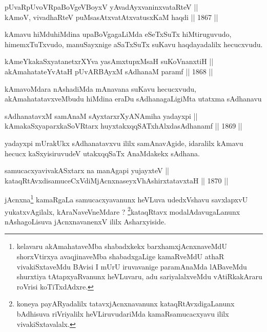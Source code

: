 \begin{shl}
pUvaRpUvoVRpaBoVgeVBoyxV yAvadAyxvaninxvataRteV || \\
kAmoV, vivadhaRteV puMsasAtxvatAtxvatusxKaM haqdi \hfill || 1867 ||
  
\end{shl}

\begin{artha}
kAmavu hiMduhiMdina upaBoVgagaLiMda eSeTxSuTx hiMtiruguvudo,
himemxTuTxvudo, manuSayxnige aSaTxSuTx suKavu haqdayadalilx
hecucxvudu.
\end{artha}

\begin{shl}
kAmeYkakaSxyatanetxrXYva yasAmxtupxMsaH suKoVnanxtiH || \\
akAmahatateYvAtaH pUvARBAyxM sAdhanaM paramf \hfill || 1868 ||
  
\end{shl}

\begin{artha}
kAmavoMdara nAshadiMda mAnavana suKavu hecucxvudu,
akAmahatatavxveMbudu hiMdina eraDu sAdhanagaLigiMta utatxma sAdhanavu 
\end{artha}


\begin{shl}
sAdhanatavxM samAnaM sAyxtarxrXyANAmiha yadayxpi || \\
kAmakaSxyaparxkaSoVR\s tarx huyxtakxqqSATxhAlxdasAdhanamf \hfill || 1869 ||
  
\end{shl}

\begin{artha}
yadayxpi mUrakUkx sAdhanatavxvu ililx samAnavAgide, idaralilx kAmavu
hecucx kaSxyisiruvudeV utakxqqSaTx AnaMdakekx sAdhana.
\end{artha}

\begin{shl}
samucacxyavivakASx\s tarx na manAgapi yujayxteV || \\
kataqRtAvxdisamuceCxVdiMjAcnxnaseyxVhA\s \s shirxtatavxtaH \hfill || 1870 ||
  
\end{shl}

\begin{artha}
jAcnxna\footnote{kelavaru akAmahataveMba shabadxkekx
barxhamxjAcnxnaveMdU shorxVtirxya avaqjinaveMba shabadxgaLige
kamaRveMdU athaR vivakiSxtaveMdu BAvisi I mUrU iruvavanige
paramAnaMda lABaveMdu shurxtiya tAtapxyaRvanunx heVLuvaru, adu
sariyalalxveMdu vAtiRkakAraru roVrisi koTiTxdAdxre.} kamaRgaLa samucacxyavanunx heVLuva udedxVshavu savxlapxvU
yukatxvAgilalx, kAraNaveVneMdare ? \footnote{koneya payARyadalilx
tatavxjAcnxnavanunx kataqRtAvxdigaLanunx bAdhisuva riVriyalilx
heVLiruvudariMda kamaRsamucacxyavu ililx vivakiSxtavalalx.}kataqRtavx
modalAdavugaLanunx nAshagoLisuva jAcnxnavanenxV ililx Asharxyiside.
\end{artha}


